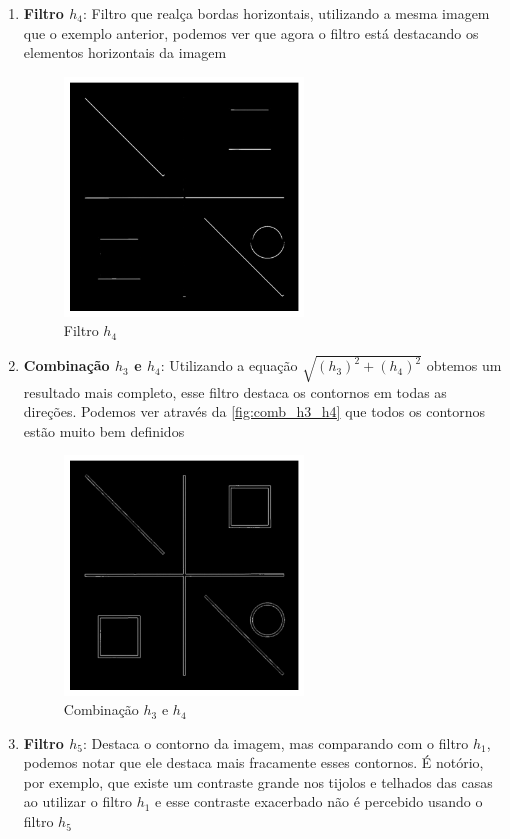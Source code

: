 \documentclass[12pt,a4paper]{report}
\begin{document}
\begin{enumerate}
    \item \textbf{Filtro $h_4$}: Filtro que realça bordas horizontais, utilizando a mesma imagem que o exemplo anterior, podemos ver que agora o filtro está destacando os elementos horizontais da imagem
    \begin{figure}[H]
      \centering
      \includegraphics[width=0.6\textwidth]{imagens/ex10-04.png}
      \caption{Filtro $h_4$}
    \end{figure}
    \item \textbf{Combinação $h_3$ e $h_4$}: Utilizando a equação $\sqrt{(h_3)^2 + (h_4)^2}$ obtemos um resultado mais completo, esse filtro destaca os contornos em todas as direções. Podemos ver através da \autoref{fig:comb_h3_h4} que todos os contornos estão muito bem definidos
    \begin{figure}[H]
      \centering
      \includegraphics[width=0.6\textwidth]{imagens/ex10-03-04.png}
      \caption{Combinação $h_3$ e $h_4$}
      \label{fig:comb_h3_h4}
    \end{figure}
    \item \textbf{Filtro $h_5$}: Destaca o contorno da imagem, mas comparando com o filtro $h_1$, podemos notar que ele destaca mais fracamente esses contornos. É notório, por exemplo, que existe um contraste grande nos tijolos e telhados das casas ao utilizar o filtro $h_1$ e esse contraste exacerbado não é percebido usando o filtro $h_5$

\end{enumerate}
\end{document}

